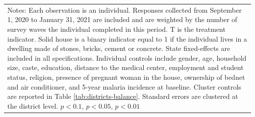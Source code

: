 {{\begin{tabular}{l*{6}{c}}
\hline\hline
\multicolumn{7}{p{1.02\linewidth}}{\scriptsize Notes: Each observation is an individual. Responses collected from September 1, 2020 to January 31, 2021 are included and are weighted by the number of survey waves the individual completed in this period. T is the treatment indicator. Solid house is a binary indicator equal to 1 if the individual lives in a dwelling made of stones, bricks, cement or concrete. State fixed-effects are included in all specifications. Individual controls include gender, age, household size, caste, education, distance to the medical center, employment and student status, religion, presence of pregnant woman in the house, ownership of bednet and air conditioner, and 5-year malaria incidence at baseline. Cluster controls are reported in Table \ref{tab:districts-balance}. Standard errors are clustered at the district level. \sym{*} \(p<0.1\), \sym{**} \(p<0.05\), \sym{***} \(p<0.01\)}\\
\end{tabular}
}%

}
